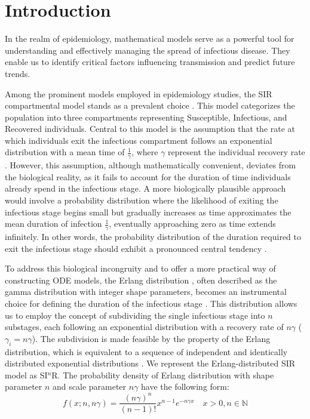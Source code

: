 \documentclass[12pt]{article}
\begin{document}
\section*{Introduction}
In the realm of epidemiology, mathematical models serve as a powerful tool for understanding and effectively managing the spread of infectious disease. They enable us to identify critical factors influencing transmission and predict future trends.
\par
Among the prominent models employed in epidemiology studies, the SIR compartmental model stands as a prevalent choice \cite{McKendrick1927}\cite{Anderson1991}. This model categorizes the population into three compartments representing Susceptible, Infectious, and Recovered individuals. Central to this model is the assumption that the rate at which individuals exit the infectious compartment follows an exponential distribution with a mean time of $\frac{1}{\gamma}$, where $\gamma$ represent the individual recovery rate \cite{Hethcote2000}. However, this assumption, although mathematically convenient, deviates from the biological reality, as it fails to account for the duration of time individuals already spend in the infectious stage. A more biologically plausible approach would involve a probability distribution where the likelihood of exiting the infectious stage begins small but gradually increases as time approximates the mean duration of infection $\frac{1}{\gamma}$, eventually approaching zero as time extends infinitely. In other words, the probability distribution of the duration required to exit the infectious stage should exhibit a pronounced central tendency \cite{Sartwell1950}\cite{Simpson1952}\cite{Bailey1954}\cite{Gough1977}.
\par
To address this biological incongruity and to offer a more practical way of constructing ODE models, the Erlang distribution \cite{Anderson1980}\cite{Lloyd2001}\cite{Ma2006}, often described as the gamma distribution with integer shape parameters, becomes an instrumental choice for defining the duration of the infectious stage \cite{Olga2013}\cite{Nguyen2007}. This distribution allows us to employ the concept of subdividing the single infectious stage into $n$ substages, each following an exponential distribution with a recovery rate of $n \gamma$ ($\gamma_i = n \gamma$). The subdivision is made feasible by the property of the Erlang distribution, which is equivalent to a sequence of independent and identically distributed exponential distributions \cite{Tummal2011}. We represent the Erlang-distributed SIR model as SI$^n$R. The probability density of Erlang distribution with shape parameter $n$ and scale parameter $n \gamma$ have the following form: 
\begin{equation*}
    f(x; n,n\gamma) = \frac{(n\gamma)^n}{(n-1)!} x^{n-1} e^{-n\gamma x} \quad x>0, n \in \mathbb{N}
\end{equation*}
\end{document}
